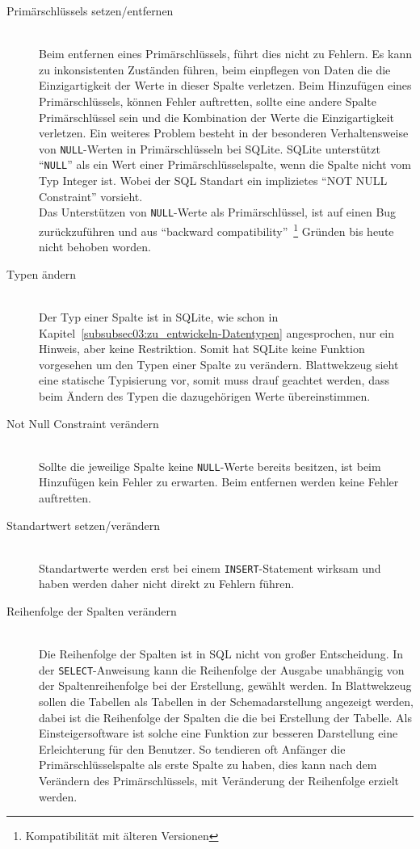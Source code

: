 \begin{description}
\item[Primärschlüssels setzen/entfernen] \hfill\\
Beim entfernen eines Primärschlüssels, führt dies nicht zu Fehlern. Es kann zu inkonsistenten Zuständen führen, beim einpflegen von Daten die die Einzigartigkeit der Werte in dieser Spalte verletzen.
Beim Hinzufügen eines Primärschlüssels, können Fehler auftretten, sollte eine andere Spalte Primärschlüssel sein und die Kombination der Werte die Einzigartigkeit verletzen.
Ein weiteres Problem besteht in der besonderen Verhaltensweise von \texttt{NULL}-Werten in Primärschlüsseln bei SQLite.
SQLite unterstützt ``\texttt{NULL}'' als ein Wert einer Primärschlüsselspalte, wenn die Spalte nicht vom Typ Integer ist. Wobei der SQL Standart ein implizietes ``NOT NULL Constraint'' vorsieht.\\
Das Unterstützen von \texttt{NULL}-Werte als Primärschlüssel, ist auf einen Bug zurückzuführen und aus ``backward compatibility''~\footnote{Kompatibilität mit älteren Versionen} Gründen bis heute nicht behoben worden.\cite{sqlite_create_table_nullpk}

\item[Typen ändern] \hfill\\
Der Typ einer Spalte ist in SQLite, wie schon in Kapitel~\ref{subsubsec03:zu_entwickeln-Datentypen} angesprochen, nur ein Hinweis, aber keine Restriktion. Somit hat SQLite keine Funktion vorgesehen um den Typen einer Spalte zu verändern. Blattwekzeug sieht eine statische Typisierung vor, somit muss drauf geachtet werden, dass beim Ändern des Typen die dazugehörigen Werte übereinstimmen.

\item[Not Null Constraint verändern] \hfill\\
Sollte die jeweilige Spalte keine \texttt{NULL}-Werte bereits besitzen, ist beim Hinzufügen kein Fehler zu erwarten.
Beim entfernen werden keine Fehler auftretten.

\item[Standartwert setzen/verändern] \hfill\\
Standartwerte werden erst bei einem \texttt{INSERT}-Statement wirksam und haben werden daher nicht direkt zu Fehlern führen.

\item[Reihenfolge der Spalten verändern] \hfill\\
Die Reihenfolge der Spalten ist in SQL nicht von großer Entscheidung.
In der \texttt{SELECT}-Anweisung kann die Reihenfolge der Ausgabe unabhängig von der Spaltenreihenfolge bei der Erstellung, gewählt werden.
In Blattwekzeug sollen die Tabellen als Tabellen in der Schemadarstellung angezeigt werden, dabei ist die Reihenfolge der Spalten die die bei Erstellung der Tabelle. Als Einsteigersoftware ist solche eine Funktion zur besseren Darstellung eine Erleichterung für den Benutzer. So tendieren oft Anfänger die Primärschlüsselspalte als erste Spalte zu haben, dies kann nach dem Verändern des Primärschlüssels, mit Veränderung der Reihenfolge erzielt werden.


\end{description}
